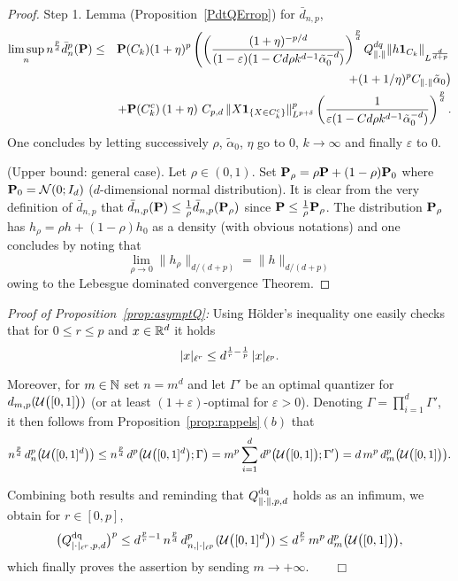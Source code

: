 \begin{proof} {\sc Step 1.}
 Lemma (Proposition~\ref{PdtQErrop}) for $\bar d_{n,p}$,
 \begin{eqnarray*}
 \limsup_nn^{\frac pd} \bar d_{n}^p(\mathbf{P})  &\le&  \mathbf{P}(C_k)
 (1+\eta)^p\left(\left(\frac{(1+\eta)^{-p/d}}{(1-\varepsilon)(1-Cd\rho
 k^{d-1}\tilde \alpha^{-d}_0)}\right)^{\frac pd}Q^{dq}_{\lVert.\rVert}\lVert h\mbox{\bf 1}_{C_k}\rVert_{L^{\frac{d}{d+p}}}\right.\\ &&\left. 
 +  (1+1/\eta)^pC_{\lVert.\rVert}\tilde \alpha_0 \right)\\ 
 &&+ \mathbf{P}(C^c_k) \,(1+\eta)\,\,C_{p,d}\,\lVert X \mbox{\bf 1}_{\{X\in C^c_k\}}
 \rVert^p_{L^{p+\delta}} \left(\frac{1}{\varepsilon(1-Cd\rho k^{d-1}\tilde \alpha^{-d}_0)}\right)^{\frac pd}.
 \end{eqnarray*}
 One concludes by letting successively $\rho$, $\tilde \alpha_0$, $\eta$ go
 to $0$,   $k \to \infty$ and finally $\varepsilon$ to  $0$.
 
 
\medskip
{} (Upper bound: general case). Let $\rho\!\in (0,1)$. Set
$\mathbf{P}_{\rho}= \rho \mathbf{P}+(1-\rho)\mathbf{P}_0$ where $\mathbf{P}_0= {\cal N}(0;I_d)$
($d$-dimensional normal distribution). It is clear from the very definition of
$\bar d_{n,p}$ that $\bar d_{n,p}(\mathbf{P})\le \frac{1}{\rho} \bar
d_{n,p}(\mathbf{P}_{\rho})$ since $\mathbf{P}\le \frac{1}{\rho} \mathbf{P}_{\rho}$. The
distribution $\mathbf{P}_{\rho}$ has $h_{\rho}= \rho h+(1-\rho)h_0$ as a density (with obvious
notations) and one concludes by noting that 
\[ 
\lim_{\rho\to
0}\|h_{\rho}\|_{d/(d+p)}= \|h\|_{d/(d+p)} 
\] 
owing to the Lebesgue dominated convergence Theorem.
\end{proof}

{\em Proof of Proposition~\ref{prop:asymptQ}:}
Using H\"older's inequality one easily checks that for $0\leq r\leq p$ and
$x\in\mathbb{R}^d$ it holds
\[
	\lvert x\rvert_{\ell^r} \leq d^{\frac{1}{r} - \frac{1}{p}}\, \lvert x\rvert_{\ell^p}.
\]
 
Moreover, for $m\in\mathbb{N}$ set $n = m^d$ and let $\Gamma'$ be an optimal quantizer
for $d_{m,p}(\mathcal{U}\bigl([0,1]\bigr))$ (or at least $(1+\varepsilon)$-optimal for $\varepsilon > 0$).
Denoting $\Gamma = \prod_{i=1}^d \Gamma'$, it then follows from Proposition~\ref{prop:rappels}$(b)$ that
\[
n^\frac{p}{d}\, d^p_n\big(\mathcal{U}\bigl([0,1]^d\bigr)\big) \leq n^\frac{p}{d}\, d^p\big(\mathcal{U}\bigl([0,1]^d\bigr);\Gamma\big) = m^p
	\sum_{i=1}^d d^p\big(\mathcal{U}\bigl([0,1]\bigr); \Gamma'\big)  = d\, m^p \,d^p_m\big(\mathcal{U}\bigl([0,1]\bigr)\big).
\]

Combining both results and reminding that $Q^{\text{dq}}_{\lVert\cdot\rVert, p, d}$ holds as an infimum, we obtain
for $r\!\in [0,p]$,  
\[
\bigl(Q^{\text{dq}}_{\lvert\cdot\rvert_{\ell^r}, p, d}\bigr)^p \leq d^{\frac{p}{r}-1}
\, n^{\frac{p}{d}}\, d^p_{n, \lvert\cdot\rvert_{\ell^p}}(\mathcal{U}\bigl([0,1]^d\bigr)) \leq d^{\frac{p}{r}}
\, m^p \,d^p_m\big(\mathcal{U}\bigl([0,1]\bigr)\big),
\]
which finally proves the assertion by sending $m\to+\infty$.$\qquad \Box$

